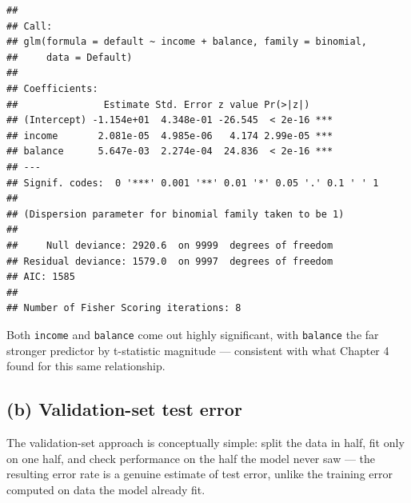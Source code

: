 \documentclass[
  11pt,
]{article}
\newenvironment{Shaded}{\begin{snugshade}}{\end{snugshade}}
\newcommand{\AttributeTok}[1]{\textcolor[rgb]{0.13,0.29,0.53}{#1}}
\newcommand{\DecValTok}[1]{\textcolor[rgb]{0.00,0.00,0.81}{#1}}
\newcommand{\FloatTok}[1]{\textcolor[rgb]{0.00,0.00,0.81}{#1}}
\newcommand{\FunctionTok}[1]{\textcolor[rgb]{0.13,0.29,0.53}{\textbf{#1}}}
\newcommand{\NormalTok}[1]{#1}
\newcommand{\OtherTok}[1]{\textcolor[rgb]{0.56,0.35,0.01}{#1}}
\newcommand{\SpecialCharTok}[1]{\textcolor[rgb]{0.81,0.36,0.00}{\textbf{#1}}}
\newcommand{\StringTok}[1]{\textcolor[rgb]{0.31,0.60,0.02}{#1}}
\begin{document}
\begin{verbatim}
## 
## Call:
## glm(formula = default ~ income + balance, family = binomial, 
##     data = Default)
## 
## Coefficients:
##               Estimate Std. Error z value Pr(>|z|)    
## (Intercept) -1.154e+01  4.348e-01 -26.545  < 2e-16 ***
## income       2.081e-05  4.985e-06   4.174 2.99e-05 ***
## balance      5.647e-03  2.274e-04  24.836  < 2e-16 ***
## ---
## Signif. codes:  0 '***' 0.001 '**' 0.01 '*' 0.05 '.' 0.1 ' ' 1
## 
## (Dispersion parameter for binomial family taken to be 1)
## 
##     Null deviance: 2920.6  on 9999  degrees of freedom
## Residual deviance: 1579.0  on 9997  degrees of freedom
## AIC: 1585
## 
## Number of Fisher Scoring iterations: 8
\end{verbatim}

Both \texttt{income} and \texttt{balance} come out highly significant,
with \texttt{balance} the far stronger predictor by t-statistic
magnitude --- consistent with what Chapter 4 found for this same
relationship.

\subsection{(b) Validation-set test
error}\label{b-validation-set-test-error}

The validation-set approach is conceptually simple: split the data in
half, fit only on one half, and check performance on the half the model
never saw --- the resulting error rate is a genuine estimate of test
error, unlike the training error computed on data the model already fit.

\begin{Shaded}
\end{Shaded}
\end{document}
